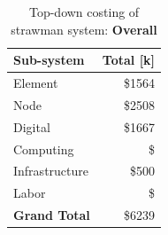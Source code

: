 \documentclass[11pt]{article}
\begin{document}
\begin{table}[h]
\begin{center}
\caption{\label{tab:costingOverall}Top-down costing of strawman system:  \bf{Overall}}
\begin{tabular}{| l | r |}
\hline
\bf Sub-system & \bf {Total [k]} \\
\hline
Element & \$1564 \\
\hline
Node & \$2508 \\
\hline
Digital & \$1667 \\
\hline
Computing & \$ \\
\hline
Infrastructure & \$500 \\
\hline
Labor & \$ \\
\hline
\bf{Grand Total} & \$6239 \\
\hline
\end{tabular}
\end{center}
\end{table}
\end{document}
